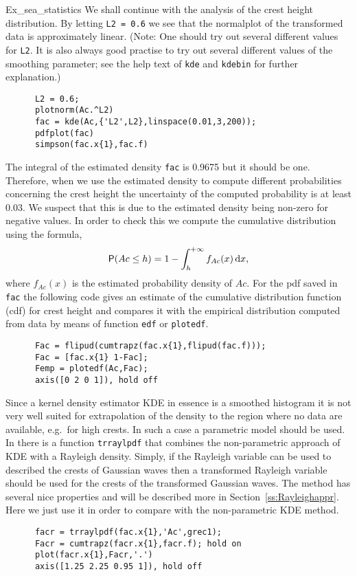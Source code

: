 \begin{cex}{Ex_sea_statistics}
We shall continue with the analysis of the crest height distribution.
By letting {\tt L2 = 0.6} we see that the normalplot of the transformed data is
approximately linear.
(Note: One should try out several different values for {\tt L2}.
It is also always good practise to try out several different values of
the smoothing parameter; see the help text of {\tt kde} and {\tt kdebin} for
further explanation.)
{\small\begin{verbatim}
      L2 = 0.6;
      plotnorm(Ac.^L2)
      fac = kde(Ac,{'L2',L2},linspace(0.01,3,200));
      pdfplot(fac)
      simpson(fac.x{1},fac.f)
\end{verbatim}}

The integral of the estimated density {\tt fac} is 0.9675 but it should
be one. Therefore, when we use the estimated density to compute different
probabilities concerning the crest height the uncertainty of the computed
probability is at least 0.03. We suspect that this is due to the
estimated density being non-zero for negative values.
In order to check this we compute the
cumulative distribution using the formula,
$$
\mbox{\sf P} (Ac\le h)=1-\int_h^{+\infty} f_{Ac}(x)\, \mathrm{d} x,
$$
where $f_{Ac}(x)$ is the estimated probability density of $Ac$.
For the pdf saved in {\tt fac} the following code gives an estimate of
the cumulative distribution function (cdf) for
crest height and compares it with the empirical distribution
computed from data by means of
function {\tt edf}
or {\tt plotedf}.
{\small\begin{verbatim}
      Fac = flipud(cumtrapz(fac.x{1},flipud(fac.f)));
      Fac = [fac.x{1} 1-Fac];
      Femp = plotedf(Ac,Fac);
      axis([0 2 0 1]), hold off
\end{verbatim}}

Since a kernel density estimator KDE in essence is a smoothed histogram
it is not very well suited for extrapolation of the density to the region
where no data are available, e.g.\ for high crests. In such a case
a parametric model should be used. In \progname{} there is a function
{\tt trraylpdf}
that combines the non-parametric approach of KDE with a Rayleigh density.
Simply, if the Rayleigh variable can be used to described the crests of
Gaussian waves then a transformed Rayleigh variable should be used for
the crests of the transformed Gaussian waves.
The method has several nice properties and will be described more in
Section~\ref{ss:Rayleighappr}. Here we just use it in order to compare with
the non-parametric KDE method.
{\small\begin{verbatim}
      facr = trraylpdf(fac.x{1},'Ac',grec1);
      Facr = cumtrapz(facr.x{1},facr.f); hold on
      plot(facr.x{1},Facr,'.')
      axis([1.25 2.25 0.95 1]), hold off
\end{verbatim}}


\end{cex}
